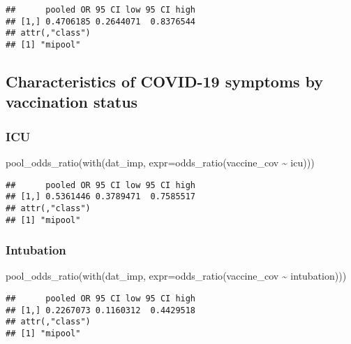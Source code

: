 \documentclass[
]{article}
\newenvironment{Shaded}{\begin{snugshade}}{\end{snugshade}}
\newcommand{\AttributeTok}[1]{\textcolor[rgb]{0.77,0.63,0.00}{#1}}
\newcommand{\FunctionTok}[1]{\textcolor[rgb]{0.00,0.00,0.00}{#1}}
\newcommand{\NormalTok}[1]{#1}
\newcommand{\SpecialCharTok}[1]{\textcolor[rgb]{0.00,0.00,0.00}{#1}}
\begin{document}
\begin{verbatim}
##      pooled OR 95 CI low 95 CI high
## [1,] 0.4706185 0.2644071  0.8376544
## attr(,"class")
## [1] "mipool"
\end{verbatim}

\hypertarget{characteristics-of-covid-19-symptoms-by-vaccination-status-1}{%
\subsection{Characteristics of COVID-19 symptoms by vaccination
status}\label{characteristics-of-covid-19-symptoms-by-vaccination-status-1}}

\hypertarget{icu-2}{%
\subsubsection{ICU}\label{icu-2}}

\begin{Shaded}
\begin{Highlighting}[]
\FunctionTok{pool\_odds\_ratio}\NormalTok{(}\FunctionTok{with}\NormalTok{(dat\_imp, }\AttributeTok{expr=}\FunctionTok{odds\_ratio}\NormalTok{(vaccine\_cov }\SpecialCharTok{\textasciitilde{}}\NormalTok{ icu))) }
\end{Highlighting}
\end{Shaded}

\begin{verbatim}
##      pooled OR 95 CI low 95 CI high
## [1,] 0.5361446 0.3789471  0.7585517
## attr(,"class")
## [1] "mipool"
\end{verbatim}

\hypertarget{intubation-2}{%
\subsubsection{Intubation}\label{intubation-2}}

\begin{Shaded}
\begin{Highlighting}[]
\FunctionTok{pool\_odds\_ratio}\NormalTok{(}\FunctionTok{with}\NormalTok{(dat\_imp, }\AttributeTok{expr=}\FunctionTok{odds\_ratio}\NormalTok{(vaccine\_cov }\SpecialCharTok{\textasciitilde{}}\NormalTok{ intubation))) }
\end{Highlighting}
\end{Shaded}

\begin{verbatim}
##      pooled OR 95 CI low 95 CI high
## [1,] 0.2267073 0.1160312  0.4429518
## attr(,"class")
## [1] "mipool"
\end{verbatim}
\end{document}
